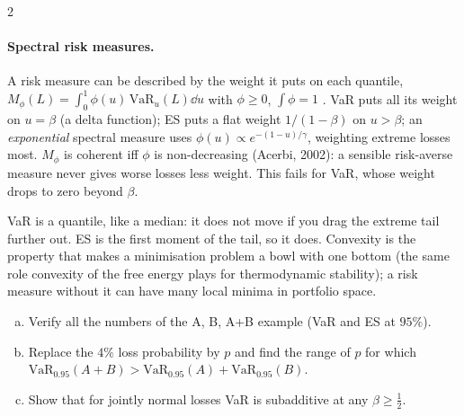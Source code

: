 \begin{paracol}{2}
\paragraph{Spectral risk measures.} A risk measure can be described by the weight it puts on each quantile,
$M_\phi(L)=\int_0^1\phi(u)\,\mathrm{VaR}_u(L)\dd u$ with $\phi\ge0$, $\int\phi=1$ . VaR puts all
its weight on $u=\beta$ (a delta function); ES puts a flat weight $1/(1-\beta)$ on $u>\beta$; an
\emph{exponential} spectral measure uses $\phi(u)\propto e^{-(1-u)/\gamma}$, weighting extreme losses most.
$M_\phi$ is coherent iff $\phi$ is non-decreasing (Acerbi, 2002): a sensible risk-averse measure never gives
worse losses less weight. This fails for VaR, whose weight drops to zero beyond $\beta$.

\begin{intuition}
VaR is a quantile, like a median: it does not move if you drag the extreme tail further out. ES is the first moment
of the tail, so it does. Convexity is the property that makes a minimisation problem a bowl with one bottom (the
same role convexity of the free energy plays for thermodynamic stability); a risk measure without it can have
many local minima in portfolio space.
\end{intuition}

\begin{exercise}
\leavevmode
\begin{enumerate}[(a)]
  \item Verify all the numbers of the A, B, A+B example (VaR and ES at $95\%$).
  \item Replace the $4\%$ loss probability by
      $p$ and find the range of $p$ for which $\mathrm{VaR}_{0.95}(A+B)>\mathrm{VaR}_{0.95}(A)+\mathrm{VaR}_{0.95}(B)$.
  \item Show that for jointly normal losses VaR is subadditive at any $\beta\ge\frac12$.
\end{enumerate}
\end{exercise}


\end{paracol}
